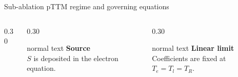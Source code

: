 \documentclass[aspectratio=169,10pt]{beamer}
\begin{document}
\begin{frame}[t]{Sub-ablation pTTM regime and governing equations}
\begin{columns}[T,totalwidth=0.94\textwidth]
\begin{column}{0.30\textwidth}
    \end{column}
    \begin{column}{0.30\textwidth}
      \begin{beamercolorbox}[wd=\linewidth,sep=0.64em]{normal text}
        \small\textbf{\color{GVSourceBlue}Source}\\
        \(S\) is deposited in the electron equation.
      \end{beamercolorbox}
    \end{column}
    \begin{column}{0.30\textwidth}
      \begin{beamercolorbox}[wd=\linewidth,sep=0.64em]{normal text}
        \small\textbf{\color{GVSlate}Linear limit}\\
        Coefficients are fixed at \(T_e=T_l=T_R\).
      \end{beamercolorbox}
    \end{column}
  \end{columns}
\end{frame}
\end{document}

